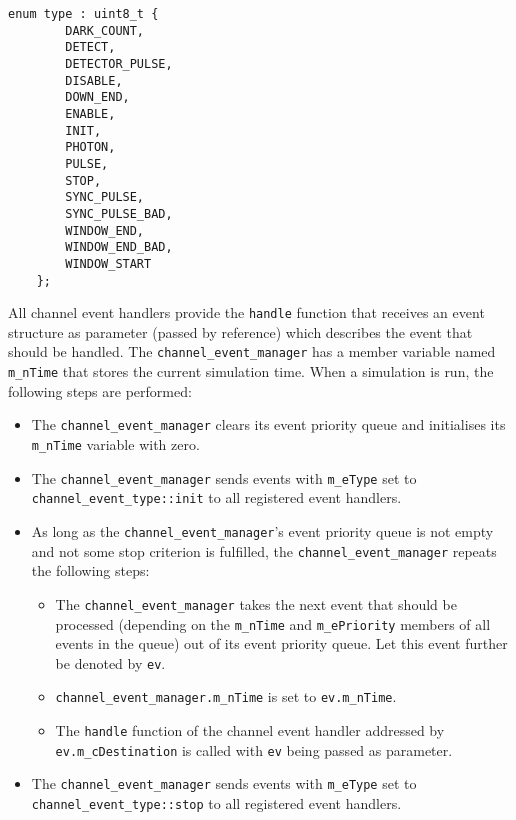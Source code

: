 \begin{lstlisting}[caption={Definition of the \texttt{channel\_event\_type} enumeration type}, captionpos=b, label={lst:event_type}]
    enum type : uint8_t {
        DARK_COUNT,
        DETECT,
        DETECTOR_PULSE,
        DISABLE,
        DOWN_END,
        ENABLE,
        INIT,
        PHOTON,
        PULSE,
        STOP,
        SYNC_PULSE,
        SYNC_PULSE_BAD,
        WINDOW_END,
        WINDOW_END_BAD,
        WINDOW_START
    };
\end{lstlisting}

All channel event handlers provide the \texttt{handle} function that receives an event structure as parameter (passed by reference) which describes the event that should be handled. The \texttt{channel\_event\_manager} has a member variable named \texttt{m\_nTime} that stores the current simulation time. When a simulation is run, the following steps are performed:

\begin{itemize}

\item The \texttt{channel\_event\_manager} clears its event priority queue and initialises its \texttt{m\_nTime} variable with zero.

\item The \texttt{channel\_event\_manager} sends events with \texttt{m\_eType} set to \texttt{channel\_event\_type::init} to all registered event handlers.

\item As long as the \texttt{channel\_event\_manager}'s event priority queue is not empty and not some stop criterion is fulfilled, the \texttt{channel\_event\_manager} repeats the following steps:

\begin{itemize}

\item The \texttt{channel\_event\_manager} takes the next event that should be processed (depending on the \texttt{m\_nTime} and \texttt{m\_ePriority} members of all events in the queue) out of its event priority queue. Let this event further be denoted by  \texttt{ev}.

\item \texttt{channel\_event\_manager.m\_nTime} is set to \texttt{ev.m\_nTime}.

\item The \texttt{handle} function of the channel event handler addressed by \texttt{ev.m\_cDestination} is called with \texttt{ev} being passed as parameter.

\end{itemize}

\item The \texttt{channel\_event\_manager} sends events with \texttt{m\_eType} set to \texttt{channel\_event\_type::stop} to all registered event handlers.

\end{itemize}

